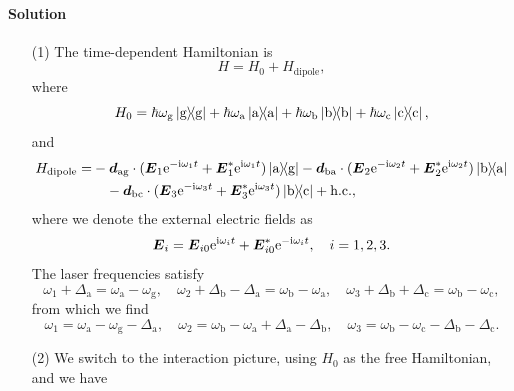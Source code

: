 \documentclass[hyperref, a4paper]{article}
\newcommand*{\ii}{\mathrm{i}}
\newcommand*{\ee}{\mathrm{e}}
\begin{document}
\paragraph{Solution} \begin{itemize}
\item[(1)] The time-dependent Hamiltonian is 
\begin{equation}
    H = H_0 + H_\text{dipole},
\end{equation}   
where 
\begin{equation}
    H_0 = \hbar \omega_\text{g} \dyad{\text{g}} + \hbar \omega_\text{a} \dyad{\text{a}} 
    + \hbar \omega_\text{b} \dyad{\text{b}} + \hbar \omega_\text{c} \dyad{\text{c}},
\end{equation}
and 
\begin{equation}
    \begin{aligned}
        H_\text{dipole} = &-  \vb*{d}_\text{ag} \cdot (\vb*{E}_1 \ee^{- \ii \omega_1 t} + \vb*{E}_1^* \ee^{\ii \omega_1 t}) \dyad*{\text{a}}{\text{g}} 
        -  \vb*{d}_\text{ba} \cdot (\vb*{E}_2 \ee^{- \ii \omega_2 t} + \vb*{E}_2^* \ee^{ \ii \omega_2 t}) \dyad*{\text{b}}{\text{a}} \\
        & \quad -  \vb*{d}_\text{bc} \cdot (\vb*{E}_3 \ee^{- \ii \omega_3 t } + \vb*{E}_3^* \ee^{ \ii \omega_3 t }) \dyad*{\text{b}}{\text{c}} + \text{h.c.},
    \end{aligned}
\end{equation}
where we denote the external electric fields as 
\begin{equation}
    \vb*{E}_i = \vb*{E}_{i0} \ee^{\ii \omega_i t } + \vb*{E}_{i0}^* \ee^{- \ii \omega_i t}, \quad i = 1, 2, 3.
\end{equation}
The laser frequencies satisfy
\begin{equation}
    \omega_1 + \Delta_\text{a} = \omega_\text{a} - \omega_\text{g}, \quad
    \omega_2 + \Delta_\text{b} - \Delta_\text{a} = \omega_\text{b} - \omega_\text{a}, \quad 
    \omega_3 + \Delta_\text{b} + \Delta_\text{c} = \omega_\text{b} - \omega_\text{c},
\end{equation}
from which we find 
\begin{equation}
    \omega_1 = \omega_\text{a} - \omega_\text{g} - \Delta_\text{a}, \quad 
    \omega_2 = \omega_\text{b} - \omega_\text{a} + \Delta_\text{a} - \Delta_\text{b} , \quad 
    \omega_3 = \omega_\text{b} - \omega_\text{c} - \Delta_\text{b} - \Delta_\text{c}.
\end{equation}
\item[(2)] We switch to the interaction picture, using $H_0$ as the free Hamiltonian, and we have 

\end{itemize}
\end{document}
